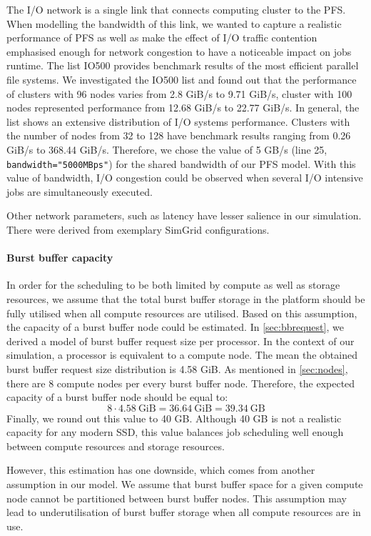 \documentclass[thesis-en.tex]{subfiles}
\begin{document}
The I/O network is a single link that connects computing cluster to the PFS. When modelling the bandwidth of this link, we wanted to capture a realistic performance of PFS as well as make the effect of I/O traffic contention emphasised enough for network congestion to have a noticeable impact on jobs runtime. The list IO500 \cite{io500} provides benchmark results of the most efficient parallel file systems. We investigated the IO500 list and found out that the performance of clusters with 96 nodes varies from 2.8 GiB/s to 9.71 GiB/s, cluster with 100 nodes represented performance from 12.68 GiB/s to 22.77 GiB/s. In general, the list shows an extensive distribution of I/O systems performance. Clusters with the number of nodes from 32 to 128 have benchmark results ranging from 0.26 GiB/s to 368.44 GiB/s. Therefore, we chose the value of 5 GB/s (line 25, \verb|bandwidth="5000MBps"|) for the shared bandwidth of our PFS model. With this value of bandwidth, I/O congestion could be observed when several I/O intensive jobs are simultaneously executed.

Other network parameters, such as latency have lesser salience in our simulation. There were derived from exemplary SimGrid configurations.

\paragraph{Burst buffer capacity}
In order for the scheduling to be both limited by compute as well as storage resources, we
assume that the total burst buffer storage in the platform should be fully utilised when all compute resources are utilised. Based on this assumption, the capacity of a burst buffer node could be estimated. In \autoref{sec:bbrequest}, we derived a model of burst buffer request size per processor. In the context of our simulation, a processor is equivalent to a compute node. The mean the obtained burst buffer request size distribution is 4.58 GiB. As mentioned in \autoref{sec:nodes}, there are 8 compute nodes per every burst buffer node. Therefore, the expected capacity of a burst buffer node should be equal to:
\[ 8 \cdot 4.58\ \text{GiB} = 36.64\ \text{GiB} = 39.34\ \text{GB} \]
Finally, we round out this value to 40 GB. Although 40 GB is not a realistic capacity for any modern SSD, this value balances job scheduling well enough between compute resources and storage resources.

However, this estimation has one downside, which comes from another assumption in our model. We assume that burst buffer space for a given compute node cannot be partitioned between burst buffer nodes. This assumption may lead to underutilisation of burst buffer storage when all compute resources are in use.
\end{document}
